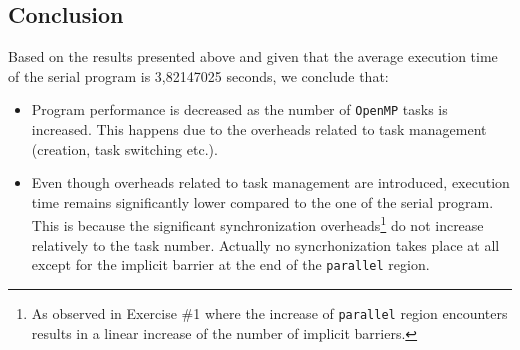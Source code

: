 \documentclass{article}
\def\code#1{\texttt{#1}}
\begin{document}
\subsection{Conclusion}
Based on the results presented above and given that the average execution time of the serial
program is 3,82147025 seconds, we conclude that:

\begin{itemize}
 \item Program performance is decreased as the number of \texttt{OpenMP} tasks is increased.
       This happens due to the overheads related to task management (creation,
       task switching etc.).
 \item Even though overheads related to task management are introduced, execution time remains
       significantly lower compared to the one of the serial program. This is because
       the significant synchronization overheads\footnote{As observed in Exercise \#1 where
       the increase of \code{parallel} region encounters results in a linear increase of
       the number of implicit barriers.} do not increase relatively to the task number.
       Actually no syncrhonization takes place at all except for the implicit barrier
       at the end of the \code{parallel} region.
\end{itemize}
\end{document}
